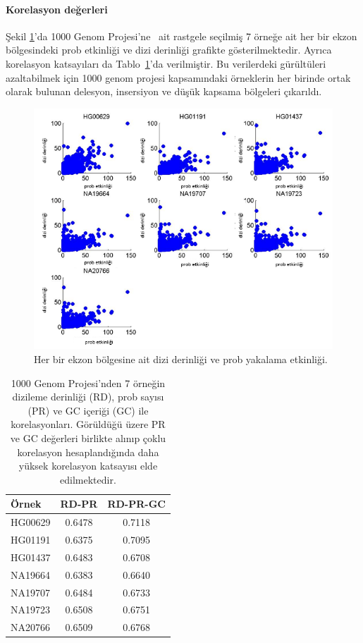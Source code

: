 \documentclass[11pt]{article}
\begin{document}
\paragraph{Korelasyon değerleri} 

Şekil \ref{fig:captureeff}'da 1000 Genom Projesi'ne~\cite{1000GP2012} ait rastgele seçilmiş 7 örneğe ait her bir ekzon bölgesindeki prob etkinliği ve dizi derinliği grafikte gösterilmektedir. Ayrıca korelasyon katsayıları da Tablo~\ref{tab:correlation}'da verilmiştir. Bu verilerdeki gürültüleri azaltabilmek için 1000 genom projesi kapsamındaki örneklerin her birinde ortak olarak bulunan delesyon, insersiyon ve düşük kapsama bölgeleri çıkarıldı. 

\begin{figure}[htb]
\begin{center}
  \includegraphics[scale=0.65]{captureeff.png}
\end{center}
\caption{Her bir ekzon bölgesine ait dizi derinliği ve prob yakalama etkinliği.}
\label{fig:captureeff}
\end{figure}

\begin{table}[htb]
\begin{center}
\begin{tabular}{|l|c|c|}
\hline 
{\bf Örnek } & {\bf RD-PR} & {\bf RD-PR-GC}\\
\hline 
HG00629 & 0.6478 & 0.7118\\
HG01191 & 0.6375 & 0.7095\\
HG01437 & 0.6483 & 0.6708\\
NA19664 & 0.6383 & 0.6640\\
NA19707 & 0.6484 & 0.6733\\
NA19723 & 0.6508 & 0.6751\\
NA20766 & 0.6509 & 0.6768\\
\hline
\end{tabular}
\end{center}
\caption{1000 Genom Projesi'nden 7 örneğin dizileme derinliği (RD), prob sayısı (PR) ve GC içeriği (GC) ile korelasyonları. Görüldüğü üzere PR ve GC değerleri birlikte alınıp çoklu korelasyon hesaplandığında daha yüksek korelasyon katsayısı elde edilmektedir.}
\label{tab:correlation}
\end{table}
\end{document}
